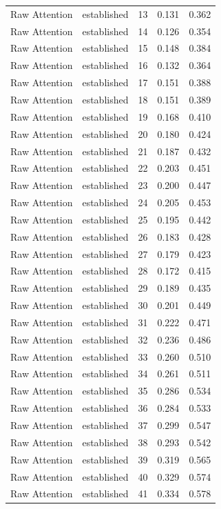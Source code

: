 \begin{tabular}{llrrr}
Raw Attention & established & 13 & 0.131 & 0.362 \\
Raw Attention & established & 14 & 0.126 & 0.354 \\
Raw Attention & established & 15 & 0.148 & 0.384 \\
Raw Attention & established & 16 & 0.132 & 0.364 \\
Raw Attention & established & 17 & 0.151 & 0.388 \\
Raw Attention & established & 18 & 0.151 & 0.389 \\
Raw Attention & established & 19 & 0.168 & 0.410 \\
Raw Attention & established & 20 & 0.180 & 0.424 \\
Raw Attention & established & 21 & 0.187 & 0.432 \\
Raw Attention & established & 22 & 0.203 & 0.451 \\
Raw Attention & established & 23 & 0.200 & 0.447 \\
Raw Attention & established & 24 & 0.205 & 0.453 \\
Raw Attention & established & 25 & 0.195 & 0.442 \\
Raw Attention & established & 26 & 0.183 & 0.428 \\
Raw Attention & established & 27 & 0.179 & 0.423 \\
Raw Attention & established & 28 & 0.172 & 0.415 \\
Raw Attention & established & 29 & 0.189 & 0.435 \\
Raw Attention & established & 30 & 0.201 & 0.449 \\
Raw Attention & established & 31 & 0.222 & 0.471 \\
Raw Attention & established & 32 & 0.236 & 0.486 \\
Raw Attention & established & 33 & 0.260 & 0.510 \\
Raw Attention & established & 34 & 0.261 & 0.511 \\
Raw Attention & established & 35 & 0.286 & 0.534 \\
Raw Attention & established & 36 & 0.284 & 0.533 \\
Raw Attention & established & 37 & 0.299 & 0.547 \\
Raw Attention & established & 38 & 0.293 & 0.542 \\
Raw Attention & established & 39 & 0.319 & 0.565 \\
Raw Attention & established & 40 & 0.329 & 0.574 \\
Raw Attention & established & 41 & 0.334 & 0.578 \\

\end{tabular}
